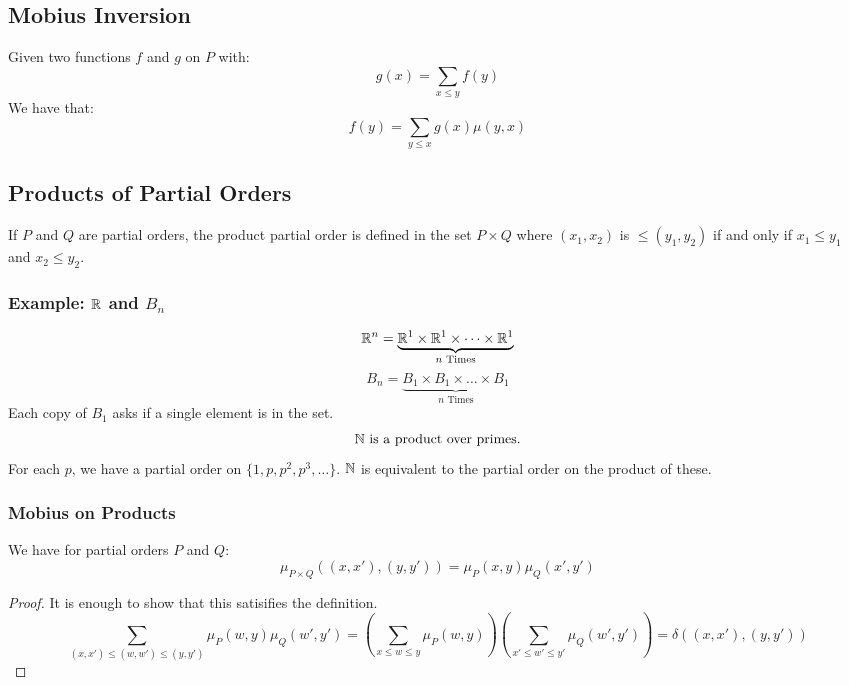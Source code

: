 \documentclass[letterpaper]{article}
\begin{document}
\subsection{Mobius Inversion}
\begin{theorem}{}{}
    Given two functions $f$ and $g$ on $P$ with:
    \[g(x) = \sum_{x \leq y} f(y)\]
    We have that:
    \[f(y) = \sum_{y \leq x} g(x) \mu(y, x)\]
\end{theorem}

\subsection{Products of Partial Orders}
\begin{definition}{}{}
    If $P$ and $Q$ are partial orders, the product partial order is defined in the set $P \times Q$ where $(x_1, x_2)$ is $\leq (y_1, y_2)$ if and only if $x_1 \leq y_1$ and $x_2 \leq y_2$. 
\end{definition}

\subsubsection{Example: \texorpdfstring{$\mathbb{R}$ and $B_n$}{R and B}}
\[\mathbb{R}^n = \underbrace{\mathbb{R}^1 \times \mathbb{R}^1 \times \dots \times \mathbb{R}^1}_{n \text{ Times}}\]
\[B_n = \underbrace{B_1 \times B_1 \times \dots \times B_1}_{n \text{ Times}}\]
Each copy of $B_1$ asks if a single element is in the set. 
\[\mathbb{N} \text{ is a product over primes.}\]
For each $p$, we have a partial order on $\{1, p, p^2, p^3, \dots\}$. $\mathbb{N}$ is equivalent to the partial order on the product of these. 

\subsubsection{Mobius on Products}
\begin{theorem}{}{}
    We have for partial orders $P$ and $Q$:
    \[\mu_{P \times Q}((x, x'), (y, y')) = \mu_{P}(x, y) \mu_{Q}(x', y')\]
\end{theorem}

\begin{proof}
    It is enough to show that this satisifies the definition. 
    \[\sum_{(x, x') \leq (w, w') \leq (y, y')} \mu_{P}(w, y) \mu_{Q}(w', y') = \left(\sum_{x \leq w \leq y} \mu_{P}(w, y)\right)\left(\sum_{x' \leq w' \leq y'} \mu_{Q}(w', y')\right) = \delta((x, x'), (y, y'))\]
\end{proof}
\end{document}
